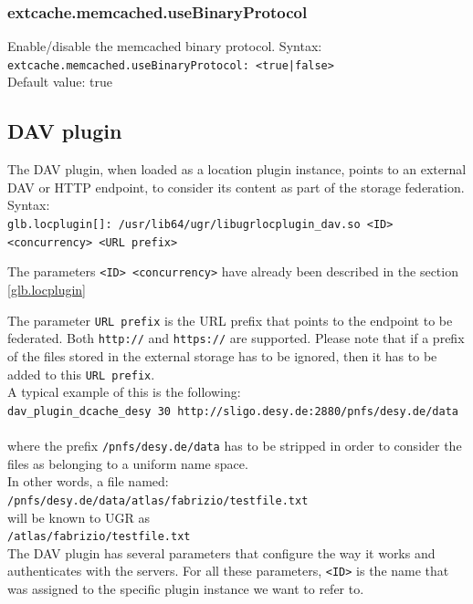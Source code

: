 \documentclass[12pt]{article} %
\begin{document}
\subsubsection{extcache.memcached.useBinaryProtocol}
Enable/disable the memcached binary protocol.
Syntax:\\
\verb"extcache.memcached.useBinaryProtocol: <true|false>"\\
Default value: true\\

\subsection{DAV plugin}

The DAV plugin, when loaded as a location plugin instance, points to an external DAV or HTTP endpoint, to consider its content as part of the storage federation.\\

Syntax:\\
\verb"glb.locplugin[]: /usr/lib64/ugr/libugrlocplugin_dav.so <ID> <concurrency> <URL prefix>"

The parameters \verb"<ID> <concurrency>" have already been described in the section \ref{glb.locplugin}

The parameter \verb"URL prefix" is the URL prefix that points to the endpoint to be federated. Both \verb"http://" and \verb"https://" are supported. Please note that if a prefix of the files stored in the external storage has to be ignored, then it has to be added to this \verb"URL prefix". \\

A typical example of this is the following:\\
\verb"dav_plugin_dcache_desy 30 http://sligo.desy.de:2880/pnfs/desy.de/data"\\ \\

where the prefix \verb"/pnfs/desy.de/data" has to be stripped in order to consider the files as belonging to a uniform name space.\\

In other words, a file named:\\
\verb"/pnfs/desy.de/data/atlas/fabrizio/testfile.txt"\\

will be known to UGR as\\
\verb"/atlas/fabrizio/testfile.txt"\\

The DAV plugin has several parameters that configure the way it works and authenticates with the servers. For all these parameters, \verb"<ID>" is the name that was assigned to the specific plugin instance we want to refer to.
\end{document}
